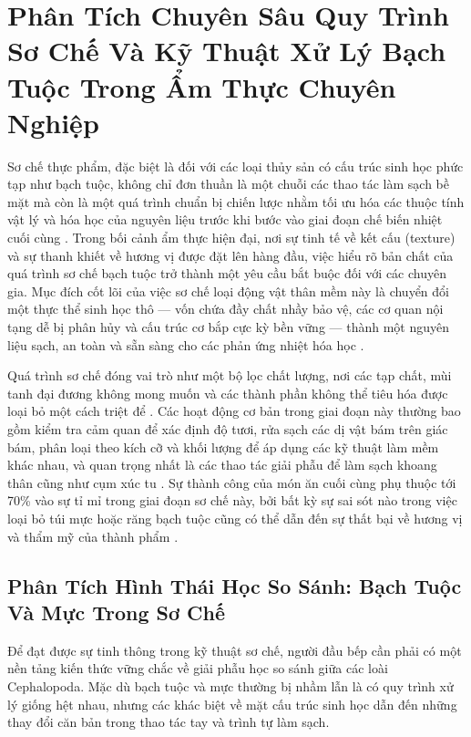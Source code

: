 \documentclass[12pt,a4paper]{report}
\begin{document}
\setcounter{page}{1} 
\setcounter{chapter}{2} %

\chapter{Phân Tích Chuyên Sâu Quy Trình Sơ Chế Và Kỹ Thuật Xử Lý Bạch Tuộc Trong Ẩm Thực Chuyên Nghiệp}

Sơ chế thực phẩm, đặc biệt là đối với các loại thủy sản có cấu trúc sinh học phức tạp như bạch tuộc, không chỉ đơn thuần là một chuỗi các thao tác làm sạch bề mặt mà còn là một quá trình chuẩn bị chiến lược nhằm tối ưu hóa các thuộc tính vật lý và hóa học của nguyên liệu trước khi bước vào giai đoạn chế biến nhiệt cuối cùng \cite{ref1}. Trong bối cảnh ẩm thực hiện đại, nơi sự tinh tế về kết cấu (texture) và sự thanh khiết về hương vị được đặt lên hàng đầu, việc hiểu rõ bản chất của quá trình sơ chế bạch tuộc trở thành một yêu cầu bắt buộc đối với các chuyên gia. Mục đích cốt lõi của việc sơ chế loại động vật thân mềm này là chuyển đổi một thực thể sinh học thô — vốn chứa đầy chất nhầy bảo vệ, các cơ quan nội tạng dễ bị phân hủy và cấu trúc cơ bắp cực kỳ bền vững — thành một nguyên liệu sạch, an toàn và sẵn sàng cho các phản ứng nhiệt hóa học \cite{ref1}.

Quá trình sơ chế đóng vai trò như một bộ lọc chất lượng, nơi các tạp chất, mùi tanh đại đương không mong muốn và các thành phần không thể tiêu hóa được loại bỏ một cách triệt để \cite{ref2}. Các hoạt động cơ bản trong giai đoạn này thường bao gồm kiểm tra cảm quan để xác định độ tươi, rửa sạch các dị vật bám trên giác bám, phân loại theo kích cỡ và khối lượng để áp dụng các kỹ thuật làm mềm khác nhau, và quan trọng nhất là các thao tác giải phẫu để làm sạch khoang thân cũng như cụm xúc tu \cite{ref1}. Sự thành công của món ăn cuối cùng phụ thuộc tới 70\% vào sự tỉ mỉ trong giai đoạn sơ chế này, bởi bất kỳ sự sai sót nào trong việc loại bỏ túi mực hoặc răng bạch tuộc cũng có thể dẫn đến sự thất bại về hương vị và thẩm mỹ của thành phẩm \cite{ref3}.

\section{Phân Tích Hình Thái Học So Sánh: Bạch Tuộc Và Mực Trong Sơ Chế}

Để đạt được sự tinh thông trong kỹ thuật sơ chế, người đầu bếp cần phải có một nền tảng kiến thức vững chắc về giải phẫu học so sánh giữa các loài Cephalopoda. Mặc dù bạch tuộc và mực thường bị nhầm lẫn là có quy trình xử lý giống hệt nhau, nhưng các khác biệt về mặt cấu trúc sinh học dẫn đến những thay đổi căn bản trong thao tác tay và trình tự làm sạch.
\end{document}
